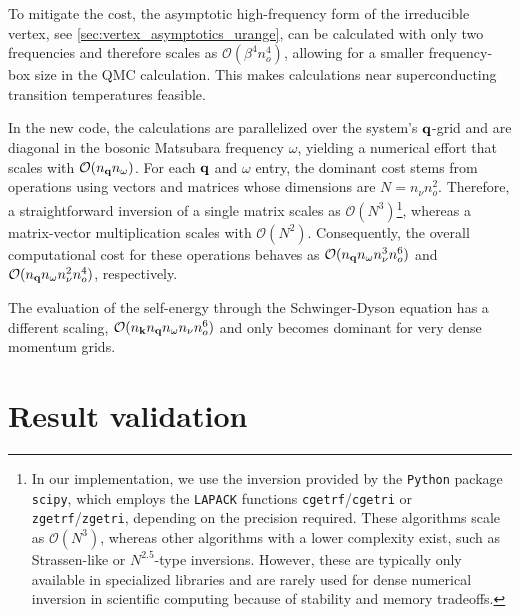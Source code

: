 \documentclass[../../main.tex]{subfiles}
\begin{document}
To mitigate the cost, the asymptotic high-frequency form of the irreducible vertex, see \ref{sec:vertex_asymptotics_urange}, can be calculated with only two frequencies and therefore scales as $\mathcal{O}(\beta^4 n_{o}^4)$, allowing for a smaller frequency-box size in the QMC calculation. This makes calculations near superconducting transition temperatures feasible.

In the new code, the calculations are parallelized over the system's $\textbf{q}$-grid and are diagonal in the bosonic Matsubara frequency $\omega$, yielding a numerical effort that scales with $\mathcal{O}(n_{\textbf{q}}n_{\omega})$. For each $\textbf{q}$ and $\omega$ entry, the dominant cost stems from operations using vectors and matrices whose dimensions are $N=n_{\nu}n_{o}^2$. Therefore, a straightforward inversion of a single matrix scales as $\mathcal{O}(N^3)$\footnote{In our implementation, we use the inversion provided by the \texttt{Python} package \texttt{scipy}, which employs the \texttt{LAPACK} functions \texttt{cgetrf}/\texttt{cgetri} or \texttt{zgetrf}/\texttt{zgetri}, depending on the precision required. These algorithms scale as $\mathcal{O}(N^3)$, whereas other algorithms with a lower complexity exist, such as Strassen-like or $N^{2.5}$-type inversions. However, these are typically only available in specialized libraries and are rarely used for dense numerical inversion in scientific computing because of stability and memory tradeoffs.}, whereas a matrix-vector multiplication scales with $\mathcal{O}(N^2)$. Consequently, the overall computational cost for these operations behaves as $\mathcal{O}(n_{\textbf{q}}n_{\omega}n_{\nu}^3n_{o}^6)$ and $\mathcal{O}(n_{\textbf{q}}n_{\omega}n_{\nu}^2n_{o}^4)$, respectively.

The evaluation of the self-energy through the Schwinger-Dyson equation has a different scaling, $\mathcal{O}(n_{\textbf{k}}n_{\textbf{q}}n_{\omega}n_{\nu}n_{o}^6)$ and only becomes dominant for very dense momentum grids.

\section{Result validation}
\end{document}
